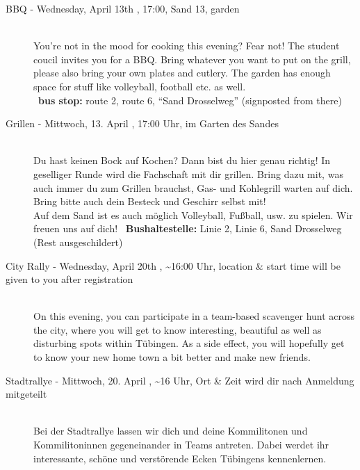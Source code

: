 \begin{description}
\ifml
	\item[BBQ - Wednesday, April 13th \YEAR, 17:00, Sand 13, garden]~\\
	You're not in the mood for cooking this evening? Fear not!
    The student coucil invites you for a BBQ. Bring whatever you want to put on the grill,
    please also bring your own plates and cutlery. The garden has enough space for stuff like volleyball, football etc. as well.\\
	~\textbf{bus stop:} route 2, route 6, "`Sand Drosselweg"' (signposted from there)
\else
\item[Grillen - Mittwoch, 13. April \YEAR, 17:00 Uhr, im Garten des Sandes]~\\
Du hast keinen Bock auf Kochen? Dann bist du hier genau richtig! In geselliger Runde wird die Fachschaft mit dir grillen.
Bring dazu mit, was auch immer du zum Grillen brauchst, Gas- und Kohlegrill warten auf dich. Bring bitte auch dein Besteck und Geschirr selbst mit!\\
Auf dem Sand ist es auch möglich Volleyball, Fußball, usw. zu spielen. Wir freuen uns auf dich!
~\textbf{Bushaltestelle:} Linie 2, Linie 6, Sand Drosselweg (Rest ausgeschildert)
\fi

\ifbachelor
\pagebreak
\fi

\ifml
	\item[City Rally - Wednesday, April 20th \YEAR, \textasciitilde 16:00 Uhr, \footnotesize{location \& start time will be given to you after registration}]~\\
	On this evening, you can participate in a team-based scavenger hunt across the city,
    where you will get to know interesting, beautiful as well as disturbing spots within Tübingen.
    As a side effect, you will hopefully get to know your new home town a bit better and make new friends.

\else
	 \item[Stadtrallye - Mittwoch, 20. April \YEAR, \textasciitilde 16 Uhr, \footnotesize{Ort \& Zeit wird dir nach Anmeldung mitgeteilt}]\ \\
	 Bei der Stadtrallye lassen wir dich und deine Kommilitonen und Kommilitoninnen gegeneinander in Teams antreten.
     Dabei werdet ihr interessante, schöne und verstörende Ecken Tübingens kennenlernen.
\fi


\end{description}
